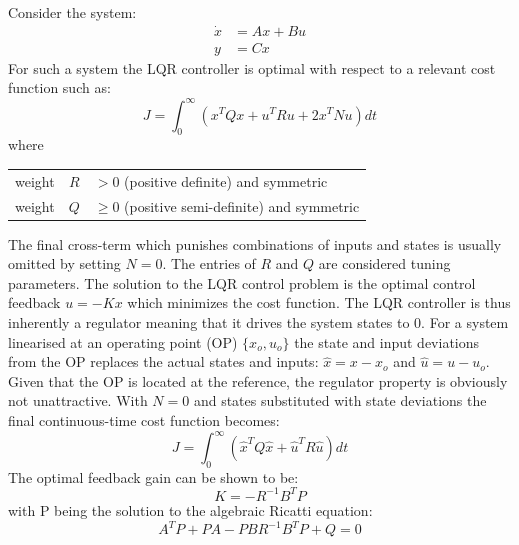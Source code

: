 \smallskip
Consider the system:
\begin{equation}\label{eq:ctrl_sys}
	\begin{split}
		\dot x &= A x + B u \\
		y &= Cx
	\end{split}
\end{equation}
For such a system the LQR controller is optimal with respect to a relevant cost function such as:
\begin{equation}\label{eq:lqr_cost}
	J = \int_{0}^{\infty} \left(x^T Q x + u^T R u + 2x^T N u\right) dt
\end{equation}
where
\begin{center}
	\begin{tabular}{l r l }
		weight & $R$         & $ > 0$\hspace{1mm} (positive definite) and symmetric       \\
		weight & $Q$		 & $\ge 0$\hspace{1mm} (positive semi-definite) and symmetric
	\end{tabular}
\end{center}
\smallskip
The final cross-term which punishes combinations of inputs and states is usually omitted by setting $ N = 0 $. The entries of $ R $ and $ Q $ are considered tuning parameters. The solution to the LQR control problem is the optimal control feedback $ u = -Kx $ which minimizes the cost function. The LQR controller is thus inherently a regulator meaning that it drives the system states to 0. For a system linearised at an operating point (OP) $ \{x_o, u_o\} $ the state and input deviations from the OP replaces the actual states and inputs: $ \hat x = x-x_o $ and $ \hat u = u-u_o $. Given that the OP is located at the reference, the regulator property is obviously not unattractive. With $ N = 0 $ and states substituted with state deviations the final continuous-time cost function becomes:
\begin{equation}\label{eq:lqr_cost_final}
	J = \int_{0}^{\infty} \left(\hat x^T Q \hat x + \hat u^T R \hat u\right) dt
\end{equation}
The optimal feedback gain can be shown to be: 
\begin{equation}\label{eq:lqr_K}
	K = -R^{-1} B^T P
\end{equation}
with P being the solution to the algebraic Ricatti equation:
\begin{equation}\label{lqr:ricatti}
	A^T P + P A - P B R^{-1} B^T P + Q = 0
\end{equation}

